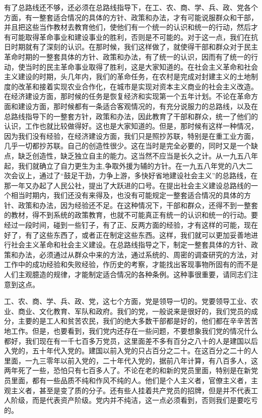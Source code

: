 有了总路线还不够，还必须在总路线指导下，在工、农、商、学、兵、政、党各个方面，有一整套适合情况的具体的方针、政策和办法，才有可能说服群众和干部，并且把这些当作教材去教育他们，使他们有一个统一的认识和统一的行动，然后才有可能取得革命事业和建设事业的胜利，否则是不可能的。对于这一点，我们在抗日时期就有了深刻的认识。在那时候，我们这样做了，就使得干部和群众对于民主革命时期的一整套具体的方针、政策和办法，有了统一的认识，因而有了统一的行动，使当时的民主革命事业取得了胜利，这是大家知道的。在社会主义革命和社会主义建设的时期，头几年内，我们的革命任务，在农村是完成对封建主义的土地制度的改革和接着实现农业合作化，在城市是实现对资本主义商业的社会主义改造。在经济建设方面，那时候的任务是恢复经济和实现第一个五年计划。不论在革命方面和建设方面，那时候都有一条适合客观情况的，有充分说服力的总路线，以及在总路线指导下的一整套方针，政策和办法，因此教育了干部和群众，统一了他们的认识，工作也就比较做得好。这也是大家知道的。但是，那时候有这样一种情况，因为我们没有经验，在经济建设方面，我们只是照抄苏联，特别是在重工业方面，几乎一切都抄苏联。自己的创造性很少。这在当时是完全必要的，同时又是一个缺点，缺乏创造性，缺乏独立自主的能力。这当然不应当是长久之计。从一九五八年起，我们就确立了自力更生为主,争取外援为辅的方针。在一九五八年党的八大二次会议上，通过了“鼓足干劲，力争上游，多快好省地建设社会主义”的总路线，在那一年又办起了人民公社，提出了大跃进的口号。在提出社会主义建设总路线的一个相当时期内，我们还没有来得及，也没有可能规定一整套适合情况的具体的方针、政策和办法，因为经验还不足。在这种情况下，干部和群众，还得不到一整套的教材，得不到系统的政策教育，也就不可能真正有统一的认识和统一的行动。要经过一段时间，碰到一些钉子，有了正、反两方面的经验，才有这样的可能，现在好了，有了这些东西了，或者正在制定这些东西。这样，我们就可以更加妥善地进行社会主义革命和社会主义建设。在总路线指导之下，制定一整套具体的方针、政策和办法，必须通过从群众中来的方法，通过系统的、周密的调查研究的方法，对工作中的成功经验和失败经验，作历史的考察，才能找出客现事物所固有的而不是人们主观臆造的规律，才能制定适合情况的各种条例。这种事很重要，请同志们注意到这点。

工、农、商、学、兵、政、党，这七个方面，党是领导一切的。党要领导工业、农业、商业、文化教育、军队和政府。我们的党，一般说来是很好的，我们党员的成分，主要的是工人和贫苦农民，我们的绝大多数干部都是好的，他们都在辛辛苦苦地工作。但是，也要看到，我们党内还存在一些问题，不要想象我们党的情况什么都好，我们现在有一千七百多万党员，这里面差不多有百分之八十的人是建国以后入党的，五十年代入党的。建国以前入党的只占百分之二十。在这百分之二十的人里面，一九三零年以前入党的，二十年代入党的，据前八年计算，有八百多人，这两年死了一些，恐怕只有七百多人了。不论在老的和新的党员里面，特别是在新党员里面，都有一些品质不纯和作风不纯的人。他们是个人主义者，官僚主义者，主观主义者，甚至是变了质的分子。还有些人挂着共产党员的招牌，但是并不代表工人阶级，而是代表资产阶级。党内并不纯洁，这一点必须看到，否则我们是要吃亏的。

